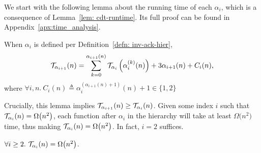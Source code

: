 \noindent We start with the following lemma about the running time of each $\alpha_i$, which is a consequence of Lemma~\ref{lem: cdt-runtime}. Its full proof can be found in Appendix~\ref{apx:time_analysis}.
\begin{lem} \label{lem: inv-ack-hier-runtime}
	When $\alpha_i$ is defined per Definition~\ref{defn: inv-ack-hier},
	\begin{equation*}
	\mathcal{T}_{\alpha_{i+1}}(n) = \sum_{k=0}^{\alpha_{i+1}(n)}\mathcal{T}_{\alpha_i}\left( \alpha_i^{(k)}(n)\right) + 3\alpha_{i+1}(n) + C_i(n),
	\end{equation*}
	where $\forall i, n.~C_i(n) \triangleq \alpha_i^{(\alpha_{i+1}(n) + 1)}(n) + 1 \in \{1, 2\}$
\end{lem}
\noindent Crucially, this lemma implies $\mathcal{T}_{\alpha_{i+1}}(n) \ge 
\mathcal{T}_{\alpha_i}(n)$. 
Given some index $i$ such that $\mathcal{T}_{\alpha_i}(n) = \Omega\big(n^2\big)$, each function after $\alpha_i$ in the hierarchy will take at least $\Omega\big(n^2\big)$ time, thus making \lb $\mathcal{T}_{\alpha_i} (n) = \Omega\big(n^2\big)$.
In fact, $i = 2$ suffices.
\begin{lem} \label{lem: alpha2_runtime_naive}
	$\forall i\ge 2.~\mathcal{T}_{\alpha_i}(n) = \Omega\big(n^2\big)$.
\end{lem}


